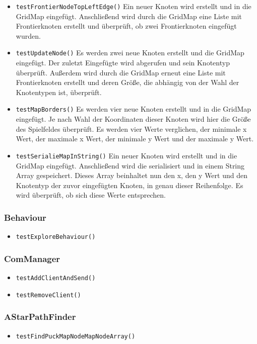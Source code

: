 \documentclass[10pt,a4paper]{article}
\begin{document}
\begin{itemize}
				\item \texttt{testFrontierNodeTopLeftEdge()} Ein neuer Knoten wird erstellt und in die GridMap eingefügt. Anschließend wird durch die GridMap eine Liste mit 									Frontierknoten erstellt und überprüft, ob zwei Frontierknoten eingefügt wurden.
				\item \texttt{testUpdateNode()} Es werden zwei neue Knoten erstellt und die GridMap eingefügt. Der zuletzt Eingefügte wird abgerufen und sein Knotentyp überprüft. Außerdem 					wird durch die GridMap erneut eine Liste mit Frontierknoten erstellt und deren Größe, die abhängig von der Wahl der Knotentypen ist, überprüft.
				\item \texttt{testMapBorders()} Es werden vier neue Knoten erstellt und in die GridMap eingefügt. Je nach Wahl der Koordinaten dieser Knoten wird hier die Größe des 							Spielfeldes überprüft. Es werden vier Werte verglichen, der minimale x Wert, der maximale x Wert, der minimale y Wert und der maximale y Wert.
				\item \texttt{testSerialieMapInString()} Ein neuer Knoten wird erstellt und in die GridMap eingefügt. Anschließend wird die serialisiert und in einem String Array 								gespeichert. Dieses Array beinhaltet nun den x, den y Wert und den Knotentyp der zuvor eingefügten Knoten, in genau dieser Reihenfolge. Es wird überprüft, ob sich diese Werte 				entsprechen.
			\end{itemize}
			
			\subsubsection{Behaviour}
			\begin{itemize}
				\item \texttt{testExploreBehaviour()} 
			\end{itemize}
			
			\subsubsection{ComManager}
			\begin{itemize}
				\item \texttt{testAddClientAndSend()}
				\item \texttt{testRemoveClient()}
			\end{itemize}
			
			\subsubsection{AStarPathFinder}
			\begin{itemize}
				\item \texttt{testFindPuckMapNodeMapNodeArray()} 
			\end{itemize}
			
\end{document}
